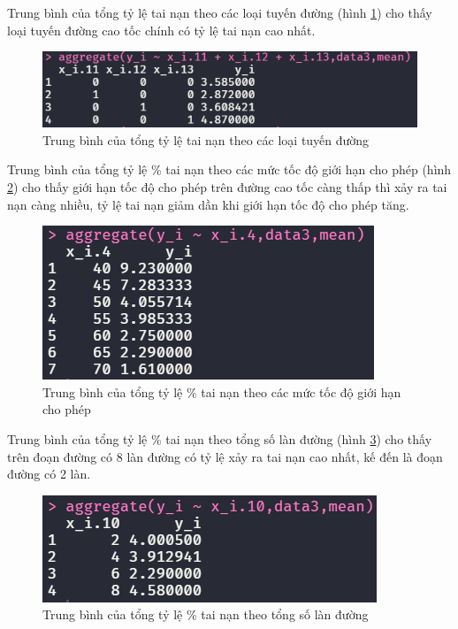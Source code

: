Trung bình của tổng tỷ lệ tai nạn theo các loại tuyến đường (hình \ref{fig-b3:aggregate-x11-13}) cho thấy loại tuyến đường cao tốc chính có tỷ lệ tai nạn cao nhất.
\begin{figure}[H]
	\centering
	\includegraphics[width=0.7\linewidth]{images/B3/aggregate-x11-13}
	\caption{Trung bình của tổng tỷ lệ tai nạn theo các loại tuyến đường}
	\label{fig-b3:aggregate-x11-13}
\end{figure}

Trung bình của tổng tỷ lệ \% tai nạn theo các mức tốc độ giới hạn cho phép (hình \ref{fig-b3:aggregate-x4}) cho thấy giới hạn tốc độ cho phép trên đường cao tốc càng thấp thì xảy ra tai nạn càng nhiều, tỷ lệ tai nạn giảm dần khi giới hạn tốc độ cho phép tăng.
\begin{figure}[H]
	\centering
	\includegraphics[width=0.45\linewidth]{images/B3/aggregate-x4}
	\caption{Trung bình của tổng tỷ lệ \% tai nạn theo các mức tốc độ giới hạn cho phép}
	\label{fig-b3:aggregate-x4}
\end{figure}

Trung bình của tổng tỷ lệ \% tai nạn theo tổng số làn đường (hình \ref{fig-b3:aggregate-x10}) cho thấy  trên đoạn đường có 8 làn đường có tỷ lệ xảy ra tai nạn cao nhất, kế đến là đoạn đường có 2 làn.
\begin{figure}[H]
	\centering
	\includegraphics[width=0.45\linewidth]{images/B3/aggregate-x10}
	\caption{Trung bình của tổng tỷ lệ \% tai nạn theo tổng số làn đường}
	\label{fig-b3:aggregate-x10}
\end{figure}

